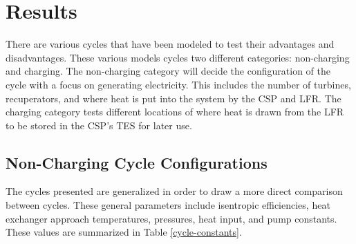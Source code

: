 \section{Results}


There are various cycles that have been modeled to test their advantages and disadvantages. These various models cycles two different categories: non-charging and charging. The non-charging category will decide the configuration of the cycle with a focus on generating electricity. This includes the number of turbines, recuperators, and where heat is put into the system by the CSP and LFR. The charging category tests different locations of where heat is drawn from the LFR to be stored in the CSP's TES for later use.

\subsection{Non-Charging Cycle Configurations}%

The cycles presented are generalized in order to draw a more direct comparison between cycles. These general parameters include isentropic efficiencies, heat exchanger approach temperatures, pressures, heat input, and pump constants. These values are summarized in Table \ref{cycle-constants}.


